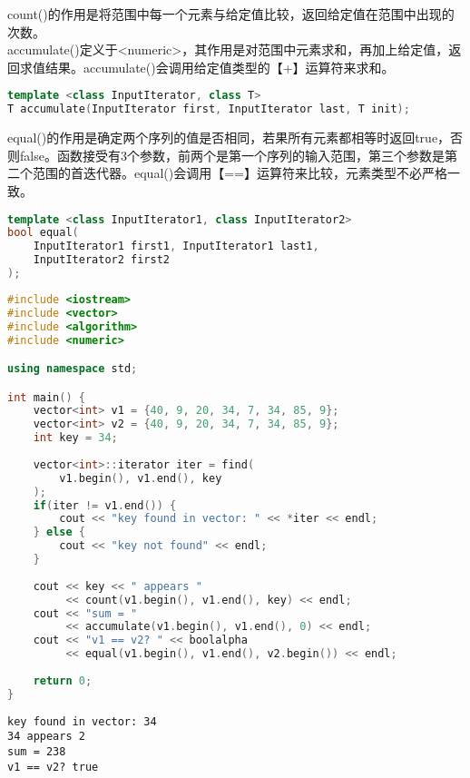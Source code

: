 count()的作用是将范围中每一个元素与给定值比较，返回给定值在范围中出现的次数。\\

accumulate()定义于<numeric>，其作用是对范围中元素求和，再加上给定值，返回求值结果。accumulate()会调用给定值类型的【+】运算符来求和。

\vspace{-0.5cm}

\begin{lstlisting}[language=C++]
template <class InputIterator, class T>
T accumulate(InputIterator first, InputIterator last, T init);
\end{lstlisting}

equal()的作用是确定两个序列的值是否相同，若果所有元素都相等时返回true，否则false。函数接受有3个参数，前两个是第一个序列的输入范围，第三个参数是第二个范围的首迭代器。equal()会调用【==】运算符来比较，元素类型不必严格一致。

\vspace{-0.5cm}

\begin{lstlisting}[language=C++]
template <class InputIterator1, class InputIterator2>
bool equal(
	InputIterator1 first1, InputIterator1 last1, 
	InputIterator2 first2
);
\end{lstlisting}

\vspace{0.5cm}


\begin{lstlisting}[language=C++]
#include <iostream>
#include <vector>
#include <algorithm>
#include <numeric>

using namespace std;

int main() {
	vector<int> v1 = {40, 9, 20, 34, 7, 34, 85, 9};
	vector<int> v2 = {40, 9, 20, 34, 7, 34, 85, 9};
	int key = 34;
	
	vector<int>::iterator iter = find(
		v1.begin(), v1.end(), key
	);
	if(iter != v1.end()) {
		cout << "key found in vector: " << *iter << endl;
	} else {
		cout << "key not found" << endl;
	}
	
	cout << key << " appears "
		 << count(v1.begin(), v1.end(), key) << endl;
	cout << "sum = "
		 << accumulate(v1.begin(), v1.end(), 0) << endl;
	cout << "v1 == v2? " << boolalpha
		 << equal(v1.begin(), v1.end(), v2.begin()) << endl;
		 
	return 0;
}
\end{lstlisting}

\begin{tcolorbox}
	\begin{verbatim}
key found in vector: 34
34 appears 2
sum = 238
v1 == v2? true
	\end{verbatim}
\end{tcolorbox}

